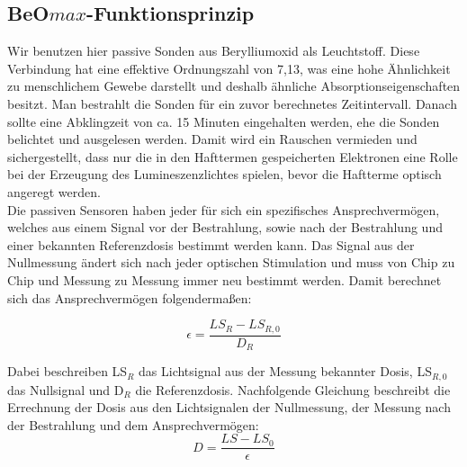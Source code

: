 \subsection{BeO$max$-Funktionsprinzip}
Wir benutzen hier passive Sonden aus Berylliumoxid als Leuchtstoff. Diese Verbindung hat eine effektive Ordnungszahl von 7,13, was eine hohe Ähnlichkeit zu menschlichem Gewebe darstellt und deshalb ähnliche Absorptionseigenschaften besitzt.
Man bestrahlt die Sonden für ein zuvor berechnetes Zeitintervall. Danach sollte eine Abklingzeit von ca. 15 Minuten eingehalten werden, ehe die Sonden belichtet und ausgelesen werden. Damit wird ein Rauschen vermieden und sichergestellt, dass nur die in den Hafttermen gespeicherten Elektronen eine Rolle bei der Erzeugung des Lumineszenzlichtes spielen, bevor die Haftterme optisch angeregt werden.\\
Die passiven Sensoren haben jeder für sich ein spezifisches Ansprechvermögen, welches aus einem Signal vor der Bestrahlung, sowie nach der Bestrahlung und einer bekannten Referenzdosis bestimmt werden kann. Das Signal aus der Nullmessung ändert sich nach jeder optischen Stimulation und muss von Chip zu Chip und Messung zu Messung immer neu bestimmt werden. Damit berechnet sich das Ansprechvermögen folgendermaßen:

\begin{equation}
    \epsilon = \frac{LS_R - LS_{R,0}}{D_R}
\end{equation}

Dabei beschreiben LS$_R$ das Lichtsignal aus der Messung bekannter Dosis, LS$_{R,0}$ das Nullsignal und D$_R$ die Referenzdosis.
Nachfolgende Gleichung beschreibt die Errechnung der Dosis aus den Lichtsignalen der Nullmessung, der Messung nach der Bestrahlung und dem Ansprechvermögen:
\begin{equation}
    D = \frac{LS - LS_0}{\epsilon}
\end{equation}